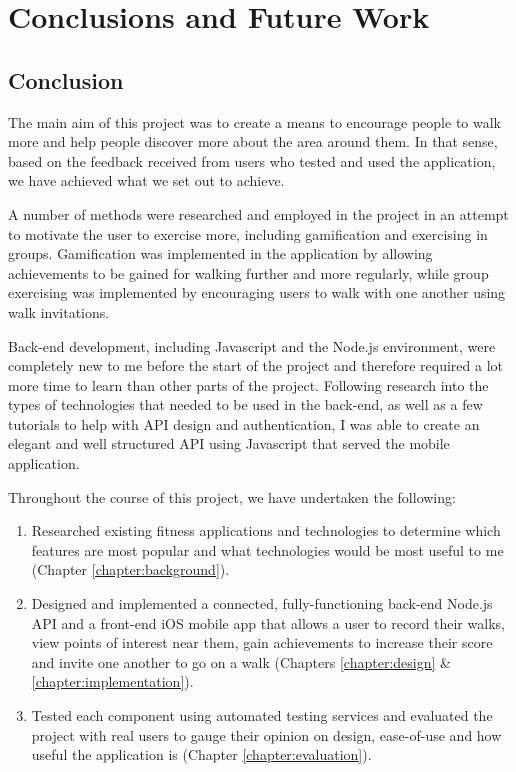 \chapter{Conclusions and Future Work}

\section{Conclusion}

The main aim of this project was to create a means to encourage people to walk more and help people discover more about the area around them. In that sense, based on the feedback received from users who tested and used the application, we have achieved what we set out to achieve.

A number of methods were researched and employed in the project in an attempt to motivate the user to exercise more, including gamification and exercising in groups. Gamification was implemented in the application by allowing achievements to be gained for walking further and more regularly, while group exercising was implemented by encouraging users to walk with one another using walk invitations. 

Back-end development, including Javascript and the Node.js environment, were completely new to me before the start of the project and therefore required a lot more time to learn than other parts of the project. Following research into the types of technologies that needed to be used in the back-end, as well as a few tutorials to help with API design and authentication, I was able to create an elegant and well structured API using Javascript that served the mobile application.

Throughout the course of this project, we have undertaken the following:

\begin{enumerate}
  \item Researched existing fitness applications and technologies to determine which features are most popular and what technologies would be most useful to me (Chapter \ref{chapter:background}).
  \item Designed and implemented a connected, fully-functioning back-end Node.js API and a front-end iOS mobile app that allows a user to record their walks, view points of interest near them, gain achievements to increase their score and invite one another to go on a walk (Chapters \ref{chapter:design} \& \ref{chapter:implementation}).
  \item Tested each component using automated testing services and evaluated the project with real users to gauge their opinion on design, ease-of-use and how useful the application is (Chapter \ref{chapter:evaluation}).
\end{enumerate}

